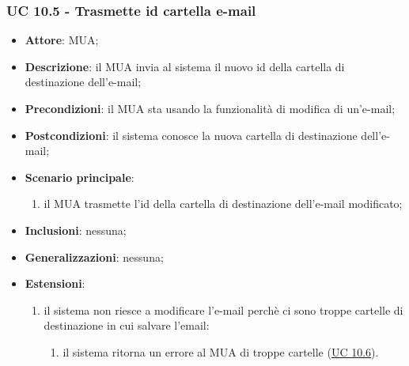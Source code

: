     \subsubsection{UC 10.5 - Trasmette id cartella e-mail} \label{sec:UC10.5}
    \begin{itemize}
        \item \textbf{Attore}: MUA;
        \item \textbf{Descrizione}: il MUA invia al sistema il nuovo id della cartella di destinazione dell'e-mail;
        \item \textbf{Precondizioni}: il MUA sta usando la funzionalità di modifica di un'e-mail;
        \item \textbf{Postcondizioni}: il sistema conosce la nuova cartella di destinazione dell'e-mail;
        \item \textbf{Scenario principale}:
            \begin{enumerate}
                \item il MUA trasmette l'id della cartella di destinazione dell'e-mail modificato;
            \end{enumerate}
        \item \textbf{Inclusioni}: nessuna;
        \item \textbf{Generalizzazioni}: nessuna;
        \item \textbf{Estensioni}:             
        \begin{enumerate}[label=\alph*.]
            \item il sistema non riesce a modificare l'e-mail perchè ci sono troppe cartelle di destinazione in cui salvare l'email:
            \begin{enumerate}[label=\arabic*.]
                \item il sistema ritorna un errore al MUA di troppe cartelle (\hyperref[sec:UC10.6]{UC 10.6}).
            \end{enumerate}
        \end{enumerate}
    \end{itemize}

